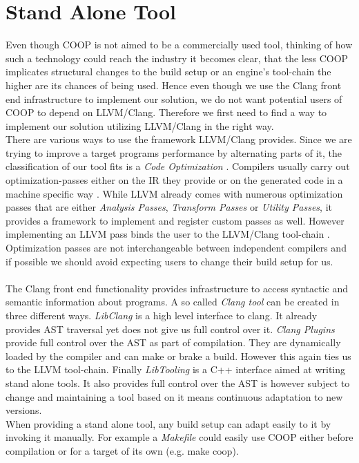 \section{Stand Alone Tool}\label{stand_alone_tool}
Even though COOP is not aimed to be a commercially used tool, thinking of how such a technology could reach the industry it becomes clear, that the less COOP implicates structural changes to the build setup or an engine's tool-chain the higher are its chances of being used. Hence even though we use the Clang front end infrastructure to implement our solution, we do not want potential users of COOP to depend on LLVM/Clang. Therefore we first need to find a way to implement our solution utilizing LLVM/Clang in the right way.\\ 
There are various ways to use the framework LLVM/Clang provides. Since we are trying to improve a target programs performance by alternating parts of it, the classification of our tool fits is a \textit{Code Optimization} . Compilers usually carry out optimization-passes either on the IR they provide or on the generated code in a machine specific way . While LLVM already comes with numerous optimization passes that are either \textit{Analysis Passes}, \textit{Transform Passes} or \textit{Utility Passes}, it provides a framework to implement and register custom passes as well. However implementing an LLVM pass binds the user to the LLVM/Clang tool-chain . Optimization passes are not interchangeable between independent compilers and if possible we should avoid expecting users to change their build setup for us.\\\\
The Clang front end functionality provides infrastructure to access syntactic and semantic information about programs. A so called \textit{Clang tool} can be created in three different ways.
\textit{LibClang} is a high level interface to clang. It already provides AST traversal yet does not give us full control over it. \textit{Clang Plugins} provide full control over the AST as part of compilation. They are dynamically loaded by the compiler and can make or brake a build. However this again ties us to the LLVM tool-chain. Finally \textit{LibTooling} is a C++ interface aimed at writing stand alone tools. It also provides full control over the AST is however subject to change and maintaining a tool based on it means continuous adaptation to new versions. \\
When providing a stand alone tool, any build setup can adapt easily to it by invoking it manually. For example a \textit{Makefile} could easily use COOP either before compilation or for a target of its own (e.g. make coop).\\
